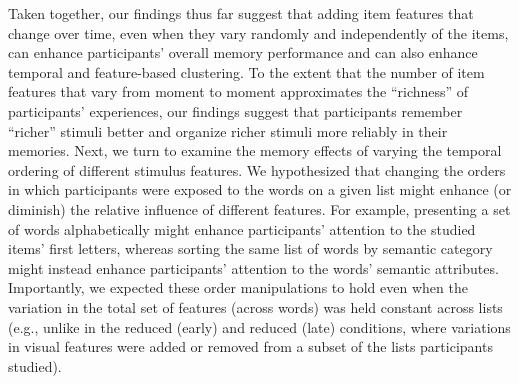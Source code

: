 \documentclass[11pt]{article}
\begin{document}
Taken together, our findings thus far suggest that adding item features that
change over time, even when they vary randomly and independently of the items,
can enhance participants' overall memory performance and can also enhance
temporal and feature-based clustering. To the extent that the number of item
features that vary from moment to moment approximates the ``richness'' of
participants' experiences, our findings suggest that participants remember
``richer'' stimuli better and organize richer stimuli more reliably in their
memories. Next, we turn to examine the memory effects of varying the temporal
ordering of different stimulus features. We hypothesized that changing the
orders in which participants were exposed to the words on a given list might
enhance (or diminish) the relative influence of different features. For
example, presenting a set of words alphabetically might enhance participants'
attention to the studied items' first letters, whereas sorting the same list of
words by semantic category might instead enhance participants' attention to the
words' semantic attributes. Importantly, we expected these order manipulations
to hold even when the variation in the total set of features (across words) was
held constant across lists (e.g., unlike in the reduced (early) and reduced
(late) conditions, where variations in visual features were added or removed
from a subset of the lists participants studied).
\end{document}
